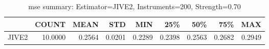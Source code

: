 \begin{table}[ht]
\centering
\caption{mse summary: Estimator=JIVE2, Instruments=200, Strength=0.70}
\begin{tabular}{lrrrrrrrr}
\toprule
 & COUNT & MEAN & STD & MIN & 25\% & 50\% & 75\% & MAX \\
\midrule
JIVE2 & 10.0000 & 0.2564 & 0.0201 & 0.2289 & 0.2398 & 0.2563 & 0.2682 & 0.2949 \\
\bottomrule
\end{tabular}
\end{table}
